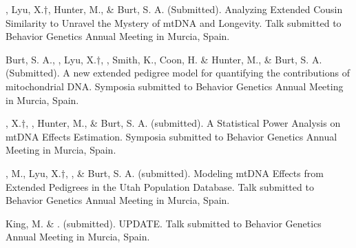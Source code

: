 
\item \meb, Lyu, X.$\dagger$, Hunter, M., \& Burt, S. A. (Submitted). Analyzing Extended Cousin Similarity to Unravel the Mystery of mtDNA and Longevity. Talk submitted to Behavior Genetics Annual Meeting in Murcia, Spain.

\item Burt, S. A., \meb, Lyu, X.$\dagger$, \Joe, Smith, K., Coon, H. \& Hunter, M., \& Burt, S. A. (Submitted). A new extended pedigree model for quantifying the contributions of mitochondrial DNA. Symposia submitted to Behavior Genetics Annual Meeting in Murcia, Spain.

\item \Lyu, X.$\dagger$, \meb, Hunter, M., \& Burt, S. A. (submitted). A Statistical Power Analysis on mtDNA Effects Estimation. Symposia submitted to Behavior Genetics Annual Meeting in Murcia, Spain.

\item \Hunter, M., Lyu, X.$\dagger$, \meb, \& Burt, S. A. (submitted). Modeling mtDNA Effects from Extended Pedigrees in the Utah Population Database. Talk submitted to Behavior Genetics Annual Meeting in Murcia, Spain.

\item  King, M. \& \meb. (submitted). UPDATE. Talk submitted to Behavior Genetics Annual Meeting in Murcia, Spain.


%
%

%

%

%

%
